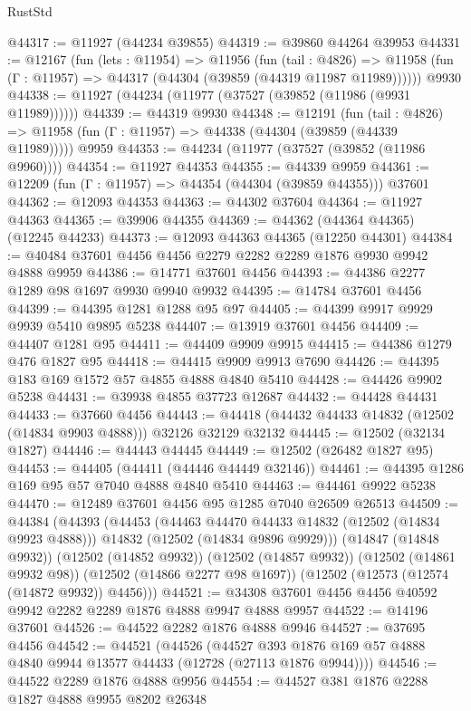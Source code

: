 \begin{lexlean}{RustStd}
\begin{coremodule}
@44317 := @11927 (@44234 @39855)
@44319 := @39860 @44264 @39953
@44331 := @12167
    (fun (lets : @11954) =>
    @11956
      (fun (tail : @4826) =>
      @11958 (fun (Γ : @11957) => @44317 (@44304 (@39859 (@44319 @11987 @11989))))))
    @9930
@44338 := @11927 (@44234 (@11977 (@37527 (@39852 (@11986 (@9931 @11989))))))
@44339 := @44319 @9930
@44348 := @12191
    (fun (tail : @4826) => @11958 (fun (Γ : @11957) => @44338 (@44304 (@39859 (@44339 @11989)))))
    @9959
@44353 := @44234 (@11977 (@37527 (@39852 (@11986 @9960))))
@44354 := @11927 @44353
@44355 := @44339 @9959
@44361 := @12209 (fun (Γ : @11957) => @44354 (@44304 (@39859 @44355))) @37601
@44362 := @12093 @44353
@44363 := @44302 @37604
@44364 := @11927 @44363
@44365 := @39906 @44355
@44369 := @44362 (@44364 @44365) (@12245 @44233)
@44373 := @12093 @44363 @44365 (@12250 @44301)
@44384 := @40484 @37601 @4456 @4456 @2279 @2282 @2289 @1876 @9930 @9942 @4888 @9959
@44386 := @14771 @37601 @4456
@44393 := @44386 @2277 @1289 @98 @1697 @9930 @9940 @9932
@44395 := @14784 @37601 @4456
@44399 := @44395 @1281 @1288 @95 @97
@44405 := @44399 @9917 @9929 @9939 @5410 @9895 @5238
@44407 := @13919 @37601 @4456
@44409 := @44407 @1281 @95
@44411 := @44409 @9909 @9915
@44415 := @44386 @1279 @476 @1827 @95
@44418 := @44415 @9909 @9913 @7690
@44426 := @44395 @183 @169 @1572 @57 @4855 @4888 @4840 @5410
@44428 := @44426 @9902 @5238
@44431 := @39938 @4855 @37723 @12687
@44432 := @44428 @44431
@44433 := @37660 @4456
@44443 := @44418 (@44432 @44433 @14832 (@12502 (@14834 @9903 @4888))) @32126 @32129 @32132
@44445 := @12502 (@32134 @1827)
@44446 := @44443 @44445
@44449 := @12502 (@26482 @1827 @95)
@44453 := @44405 (@44411 (@44446 @44449 @32146))
@44461 := @44395 @1286 @169 @95 @57 @7040 @4888 @4840 @5410
@44463 := @44461 @9922 @5238
@44470 := @12489 @37601 @4456 @95 @1285 @7040 @26509 @26513
@44509 := @44384
    (@44393
      (@44453
        (@44463 @44470 @44433 @14832 (@12502 (@14834 @9923 @4888)))
        @14832
        (@12502 (@14834 @9896 @9929)))
      (@14847 (@14848 @9932))
      (@12502 (@14852 @9932))
      (@12502 (@14857 @9932))
      (@12502 (@14861 @9932 @98))
      (@12502 (@14866 @2277 @98 @1697))
      (@12502 (@12573 (@12574 (@14872 @9932)) @4456)))
@44521 := @34308 @37601 @4456 @4456 @40592 @9942 @2282 @2289 @1876 @4888 @9947 @4888 @9957
@44522 := @14196 @37601
@44526 := @44522 @2282 @1876 @4888 @9946
@44527 := @37695 @4456
@44542 := @44521
    (@44526
      (@44527 @393 @1876 @169 @57 @4888 @4840 @9944 @13577 @44433 (@12728 (@27113 @1876 @9944))))
@44546 := @44522 @2289 @1876 @4888 @9956
@44554 := @44527 @381 @1876 @2288 @1827 @4888 @9955 @8202 @26348

\end{coremodule}
\end{lexlean}
